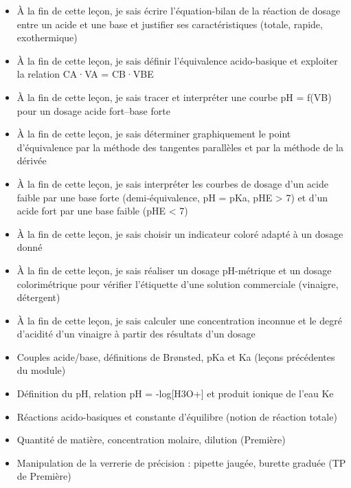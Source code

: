 \documentclass[11pt]{article}
\begin{document}
\begin{objectifs}
\begin{itemize}
\item À la fin de cette leçon, je sais écrire l'équation-bilan de la réaction de dosage entre un acide et une base et justifier ses caractéristiques (totale, rapide, exothermique)
\item À la fin de cette leçon, je sais définir l'équivalence acido-basique et exploiter la relation CA·VA = CB·VBE
\item À la fin de cette leçon, je sais tracer et interpréter une courbe pH = f(VB) pour un dosage acide fort–base forte
\item À la fin de cette leçon, je sais déterminer graphiquement le point d'équivalence par la méthode des tangentes parallèles et par la méthode de la dérivée
\item À la fin de cette leçon, je sais interpréter les courbes de dosage d'un acide faible par une base forte (demi-équivalence, pH = pKa, pHE > 7) et d'un acide fort par une base faible (pHE < 7)
\item À la fin de cette leçon, je sais choisir un indicateur coloré adapté à un dosage donné
\item À la fin de cette leçon, je sais réaliser un dosage pH-métrique et un dosage colorimétrique pour vérifier l'étiquette d'une solution commerciale (vinaigre, détergent)
\item À la fin de cette leçon, je sais calculer une concentration inconnue et le degré d'acidité d'un vinaigre à partir des résultats d'un dosage
\end{itemize}
\end{objectifs}

\begin{prerequis}
\begin{itemize}
\item Couples acide/base, définitions de Brønsted, pKa et Ka (leçons précédentes du module)
\item Définition du pH, relation pH = -log[H3O+] et produit ionique de l'eau Ke
\item Réactions acido-basiques et constante d'équilibre (notion de réaction totale)
\item Quantité de matière, concentration molaire, dilution (Première)
\item Manipulation de la verrerie de précision : pipette jaugée, burette graduée (TP de Première)
\end{itemize}
\end{prerequis}
\end{document}
